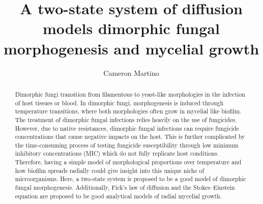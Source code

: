 \documentclass[preprint,12pt]{elsarticle}
\begin{document}
\begin{frontmatter}


\title{A two-state system of diffusion models dimorphic fungal morphogenesis and mycelial growth}




\author{Cameron Martino}

\address{University of California San Diego, La Jolla, CA, USA}

\begin{abstract}
Dimorphic fungi transition from filamentous to yeast-like morphologies in the infection of host tissues or blood. In dimorphic fungi, morphogenesis is induced through temperature transitions, where both morphologies often grow in mycelial like biofilm. The treatment of dimorphic fungal infections relies heavily on the use of fungicides. However, due to native resistances, dimorphic fungal infections can require fungicide concentrations that cause negative impacts on the host. This is further complicated by the time-consuming process of testing fungicide susceptibility through low minimum inhibitory concentrations (MIC) which do not fully replicate host conditions. Therefore, having a simple model of morphological proportions over temperature and how biofilm spreads radially could give insight into this unique niche of microorganisms. Here, a two-state system is proposed to be a good model of dimorphic fungal morphogenesis. Additionally, Fick’s law of diffusion and the Stokes–Einstein equation are proposed to be good analytical models of radial mycelial growth. \\
\end{abstract}

\end{frontmatter}
\linenumbers
\end{document}
